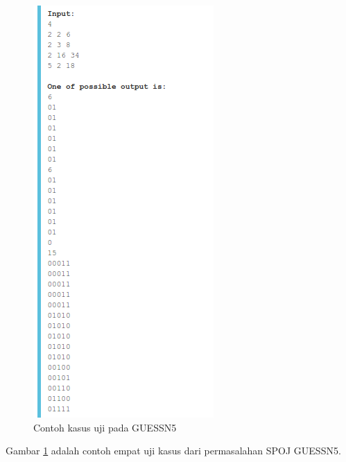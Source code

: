 \documentclass[conference,compsoc]{IEEEtran}
\begin{document}
\begin{figure}
\centering
\includegraphics[scale=0.6]{../img/example.png}
\caption{Contoh kasus uji pada GUESSN5}
\label{fig:guessn5_test_case}
\end{figure}

Gambar \ref{fig:guessn5_test_case} adalah contoh empat uji kasus dari permasalahan SPOJ GUESSN5.
\end{document}
